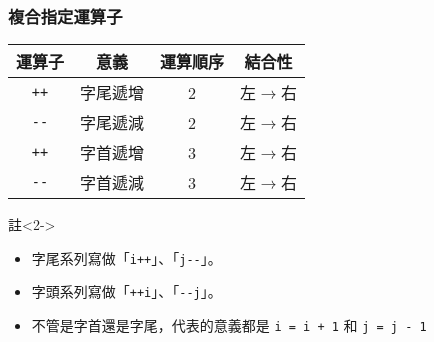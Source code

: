 \documentclass[utf8]{beamer}
\begin{document}
\begin{CJK}{UTF8}{bkai}
\begin{frame}[fragile]
  \frametitle{複合指定運算子}
  \begin{table}[h]
    \begin{tabular}{|c|c|c|c|}
    \hline
    運算子            & 意義         & 運算順序 & 結合性\\
    \hline
    \lstinline{++}{} & 字尾遞增      & 2     & 左$\rightarrow$右\\
    \hline
    \lstinline{--}{} & 字尾遞減      & 2     & 左$\rightarrow$右\\
    \hline
    \lstinline{++}{} & 字首遞增      & 3     & 左$\rightarrow$右\\
    \hline
    \lstinline{--}{} & 字首遞減      & 3     & 左$\rightarrow$右\\
    \hline
    \end{tabular}
  \end{table}
  \begin{exampleblock}{註}<2->
    \begin{itemize}
    \item 字尾系列寫做「\lstinline{i++}{}」、「\lstinline{j--}{}」。
    \item<3-> 字頭系列寫做「\lstinline{++i}{}」、「\lstinline{--j}{}」。
    \item<4-> 不管是字首還是字尾，代表的意義都是 \lstinline{i = i + 1}{} 和 \lstinline{j = j - 1}{}
    \end{itemize}
  \end{exampleblock}
\end{frame}


\end{CJK}
\end{document}
